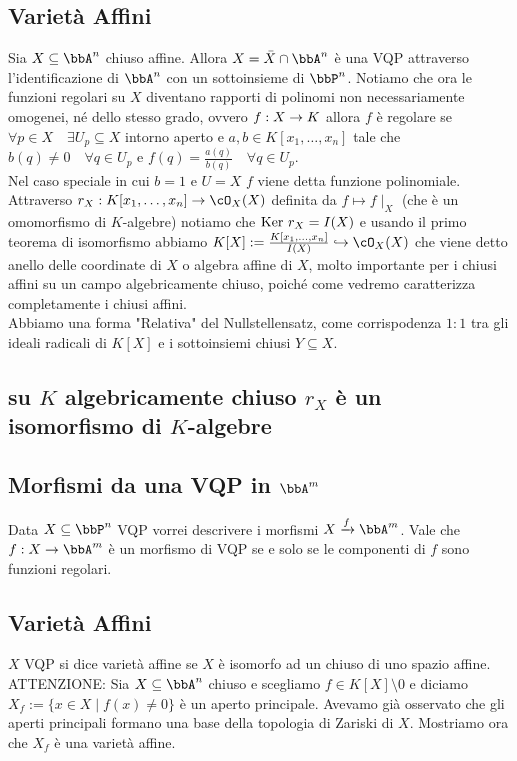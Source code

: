 \documentclass[a4paper,NoNotes,GeneralMath]{stdmdoc}
\newcommand{\hrar}{\hookrightarrow}
\newcommand{\xrar}{\xrightarrow}
\begin{document}
	\subsection*{Varietà Affini}
	Sia $X \subseteq \bbA^n$ chiuso affine. Allora $X = \bar{X} \cap \bbA^n$ è una VQP attraverso l'identificazione di $\bbA^n$ con un sottoinsieme di $\bbP^n$. Notiamo che ora le funzioni regolari su $X$ diventano rapporti di polinomi non necessariamente omogenei, né dello stesso grado, ovvero $f: X \rightarrow K$ allora $f$ è regolare se $\forall p \in X \quad \exists U_p \subseteq X$ intorno aperto e $a,b \in K[x_1, \ldots, x_n]$ tale che $b(q) \neq 0 \quad \forall q \in U_p$ e $f(q) = \frac{a(q)}{b(q)} \quad \forall q \in U_p$. \\
	Nel caso speciale in cui $b=1$ e $U = X$ $f$ viene detta funzione polinomiale. Attraverso $r_X: K[x_1, \ldots, x_n] \rar \cO_X(X)$ definita da $f \mapsto f\mid_X$ (che è un omomorfismo di $K$-algebre) notiamo che $\mbox{Ker } r_X = I(X)$ e usando il primo teorema di isomorfismo abbiamo $K[X] := \frac{K[x_1, \ldots, x_n]}{I(X)} \hrar \cO_X(X)$ che viene detto anello delle coordinate di $X$ o algebra affine di $X$, molto importante per i chiusi affini su un campo algebricamente chiuso, poiché come vedremo caratterizza completamente i chiusi affini. \\
	Abbiamo una forma "Relativa" del Nullstellensatz, come corrispodenza $1:1$ tra gli ideali radicali di $K[X]$ e i sottoinsiemi chiusi $Y \subseteq X$.
	
	\subsection*{su $K$ algebricamente chiuso $r_X$ è un isomorfismo di $K$-algebre}
	
	\subsection*{Morfismi da una VQP in $\bbA^m$}
	Data $X \subseteq \bbP^n$ VQP vorrei descrivere i morfismi $X \xrar{f} \bbA^m$. Vale che $f: X \rar \bbA^m$ è un morfismo di VQP se e solo se le componenti di $f$ sono funzioni regolari.
	
	\subsection*{Varietà Affini}
	$X$ VQP si dice varietà affine se $X$ è isomorfo ad un chiuso di uno spazio affine. \\
	ATTENZIONE: Sia $X \subseteq \bbA^n$ chiuso e scegliamo $f \in K[X] \setminus 0$ e diciamo $X_f := \{ x \in X \mid f(x) \neq 0 \}$ è un aperto principale. Avevamo già osservato che gli aperti principali formano una base della topologia di Zariski di $X$. Mostriamo ora che $X_f$ è una varietà affine.
	
\end{document}
